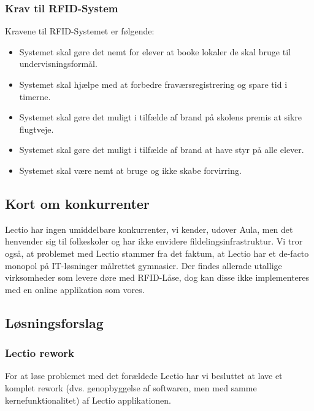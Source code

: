     \subsubsection{Krav til RFID-System}
    Kravene til RFID-Systemet er følgende:
    \begin{itemize}
        \item Systemet skal gøre det nemt for elever at booke lokaler de skal bruge til undervisningsformål.
        \item Systemet skal hjælpe med at forbedre fraværsregistrering og spare tid i timerne. 
        \item Systemet skal gøre det muligt i tilfælde af brand på skolens premis at sikre flugtveje. 
        \item Systemet skal gøre det muligt i tilfælde af brand at have styr på alle elever.
        \item Systemet skal være nemt at bruge og ikke skabe forvirring.
    \end{itemize}
    

    \subsection{Kort om konkurrenter}
        Lectio har ingen umiddelbare konkurrenter, vi kender, udover Aula, men det henvender sig til 
        folkeskoler og har ikke envidere fildelingsinfrastruktur. Vi tror også, at problemet med Lectio 
        stammer fra det faktum, at Lectio har et de-facto monopol på IT-løsninger målrettet gymnasier.
        \newline
        \newline
        Der findes allerade utallige virksomheder som levere døre med RFID-Låse, dog kan disse ikke implementeres med
        en online applikation som vores.

    \subsection{Løsningsforslag}
        \subsubsection{Lectio rework}
        For at løse problemet med det forældede Lectio har vi besluttet at lave et komplet rework (dvs. genopbyggelse af softwaren, men med samme kernefunktionalitet) af Lectio applikationen.

